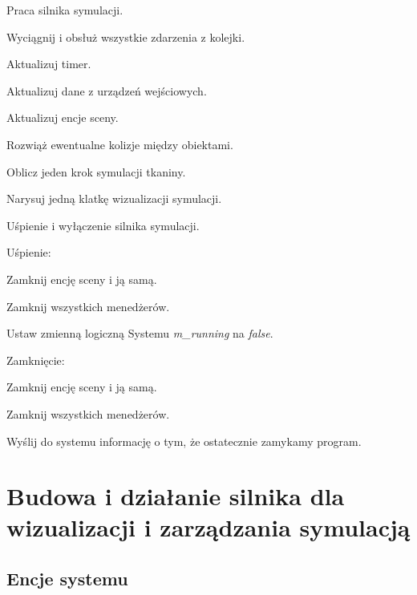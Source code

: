 	\begin{algorithm}
		\label{alg_4_2}
		\caption{Praca silnika symulacji.}	
		
		{
			Wyciągnij i obsłuż wszystkie zdarzenia z kolejki.
			
			{
				Aktualizuj timer.
				
				Aktualizuj dane z urządzeń wejściowych.
				
				Aktualizuj encje sceny.
				
				\Indp
				
				Rozwiąż ewentualne kolizje między obiektami.
				
				Oblicz jeden krok symulacji tkaniny.
				
				\Indm
				
				Narysuj jedną klatkę wizualizacji symulacji.
			}
		}	
	\end{algorithm}
	
	\begin{algorithm}
		\label{alg_4_3}
		\caption{Uśpienie i wyłączenie silnika symulacji.}	
		
		Uśpienie:
		
		\Indp
		
			Zamknij encję sceny i ją samą.
			
			Zamknij wszystkich menedżerów.
			
			Ustaw zmienną logiczną Systemu \emph{m\_running} na \emph{false}.
		
		\Indm
		
		Zamknięcie:
		
		\Indp
		
			Zamknij encję sceny i ją samą.
			
			Zamknij wszystkich menedżerów.
			
			Wyślij do systemu informację o tym, że ostatecznie zamykamy program.
		
		\Indm
		
	\end{algorithm}
	
	\section{Budowa i działanie silnika dla wizualizacji i zarządzania symulacją}
	\label{t:praktyka:silnik}
	
	
		\subsection{Encje systemu}
		\label{t:praktyka:silnik:komponent}
		
